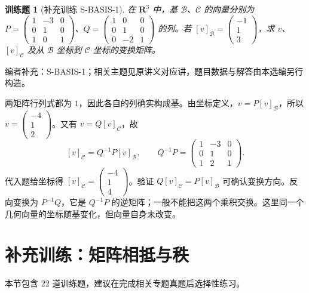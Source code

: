 \documentclass[UTF8,12pt,a4paper,fontset=fandol]{ctexart}
\newtheorem{exercise}{训练题}[section]
\begin{document}
\begin{exercise}[补充训练 S-BASIS-1]\label{prob:S-BASIS-1}
在 $\mathbf R^3$ 中，基 $\mathcal B$、$\mathcal C$ 的向量分别为 $P=\begin{pmatrix}1&-3&0\\0&1&0\\1&0&1\end{pmatrix}$、$Q=\begin{pmatrix}1&0&0\\0&1&0\\0&-2&1\end{pmatrix}$ 的列。若 $[v]_{\mathcal B}=\begin{pmatrix}-1\\1\\3\end{pmatrix}$，求 $v$、$[v]_{\mathcal C}$ 及从 $\mathcal B$ 坐标到 $\mathcal C$ 坐标的变换矩阵。
\end{exercise}
\noindent 编者补充：S-BASIS-1；相关主题见原讲义对应讲，题目数据与解答由本选编另行构造。
\begin{solve}
两矩阵行列式都为 $1$，因此各自的列确实构成基。由坐标定义，$v=P[v]_{\mathcal B}$，所以 $v=\begin{pmatrix}-4\\1\\2\end{pmatrix}$。又有 $v=Q[v]_{\mathcal C}$，故
\[[v]_{\mathcal C}=Q^{-1}P[v]_{\mathcal B},\qquad Q^{-1}P=\begin{pmatrix}1&-3&0\\0&1&0\\1&2&1\end{pmatrix}.\]
代入题给坐标得 $[v]_{\mathcal C}=\begin{pmatrix}-4\\1\\4\end{pmatrix}$。验证 $Q[v]_{\mathcal C}=P[v]_{\mathcal B}$ 可确认变换方向。反向变换为 $P^{-1}Q$，它是 $Q^{-1}P$ 的逆矩阵；一般不能把这两个乘积交换。这里同一个几何向量的坐标随基变化，但向量自身未改变。
\end{solve}

\section{补充训练：矩阵相抵与秩}

本节包含 22 道训练题，建议在完成相关专题真题后选择性练习。
\end{document}
